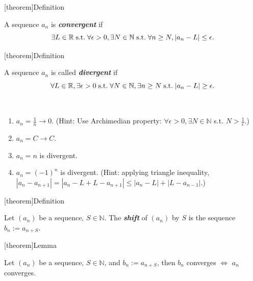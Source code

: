 \documentclass[12pt]{report}
\theoremstyle{definition}
\begin{document}
[theorem]{Definition}
\begin{convergent sequences}
    A sequence $a_n$ is \textbf{\emph{convergent}} if \[
        \exists L \in \mathbb{R} \;\textnormal{s.t.}\; \forall \epsilon > 0,
        \exists N \in \mathbb{N} \;\textnormal{s.t.}\; \forall n \ge N, |a_n - L| \le \epsilon.
    \]
\end{convergent sequences}

[theorem]{Definition}
\begin{divergent sequences}
    A sequence $a_n$ is called \textbf{\emph{divergent}} if\[
        \forall L \in \mathbb{R}, \exists \epsilon > 0 \;\textnormal{s.t.}\;
        \forall N \in \mathbb{N}, \exists n \ge N \;\textnormal{s.t.}\; |a_n - L| \ge \epsilon.
    \]
\end{divergent sequences}

\begin{ex}
    \,

    \begin{enumerate}[label = (\arabic*)]
        \item $a_n = \frac{1}{n} \rightarrow{} 0$.
            (Hint: Use Archimedian property: $\forall \epsilon > 0, \exists N \in \mathbb{N}$
            s.t. $N > \frac{1}{\epsilon}$.)
            
        \item $a_n = C \rightarrow{} C$.

        \item $a_n = n$ is divergent.

        \item $a_n = {(-1)}^{n}$ is divergent.
            (Hint: applying triangle inequality, $|a_n - a_{n + 1}| = 
            |a_n - L + L - a_{n + 1}| \le |a_n - L| + |L - a_{n - 1}|$.)
    \end{enumerate}
    
\end{ex}

[theorem]{Definition}
\begin{shift of (an)}
    Let $(a_n)$ be a sequence, $S \in \mathbb{N}$.
    The \textbf{\emph{shift}} of $(a_n)$ by $S$ is the sequence $b_n := a_{n+S}$.
\end{shift of (an)}

[theorem]{Lemma}
\begin{shift of (an) converges if (an) converges}
    Let $(a_n)$ be a sequence, $S \in \mathbb{N}$, and $b_n := a_{n + S}$, then
    $b_n$ converges $\iff$ $a_n$ converges.
\end{shift of (an) converges if (an) converges}
\end{document}

